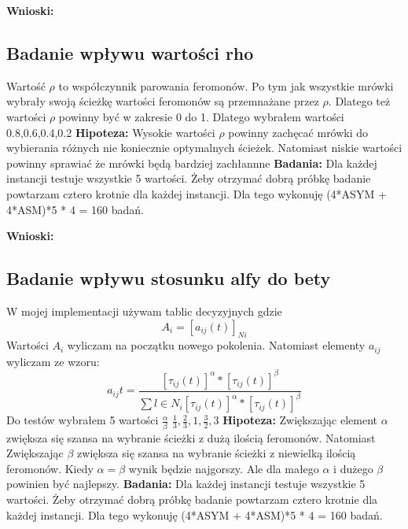 \documentclass{article}
\begin{document}
        \textbf{Wnioski: } 
      \subsection{Badanie wpływu wartości rho}
        Wartość $\rho$ to współczynnik parowania feromonów. Po tym jak wszystkie
        mrówki wybrały swoją ścieżkę wartości feromonów są przemnażane przez $\rho$.
        Dlatego też wartości $\rho$ powinny być w zakresie 0 do 1. Dlatego wybrałem
        wartości 0.8,0.6,0.4,0.2\linebreak
        \textbf{Hipoteza: } Wysokie wartości $\rho$ powinny zachęcać mrówki do wybierania
        różnych nie koniecznie optymalnych ścieżek. Natomiast niskie wartości powinny 
        sprawiać że mrówki będą bardziej zachłannne\linebreak
        \textbf{Badania: } Dla każdej instancji testuje wszystkie 5 wartości. 
        Żeby otrzymać dobrą próbkę badanie powtarzam cztero krotnie dla każdej 
        instancji. Dla tego wykonuję (4*ASYM + 4*ASM)*5 * 4 = 160 badań.\linebreak

        \textbf{Wnioski: } 
      \subsection{Badanie wpływu stosunku alfy do bety}
        W mojej implementacji używam tablic decyzyjnych gdzie \[ A_i = [a_{ij} (t)]_{Ni}\]
        Wartości $A_i$ wyliczam na początku nowego pokolenia. Natomiast elementy $a_{ij}$
        wyliczam ze wzoru:
        \[
            a_{ij}t = \frac{[\tau_{ij}(t)]^\alpha*[\tau_{ij}(t)]^\beta}{\sum{l\in N_i}[\tau_{ij}(t)]^\alpha*[\tau_{ij}(t)]^\beta}
        \]
        Do testów wybrałem 5 wartości $\frac{\alpha}{\beta}$ $\frac{1}{3},\frac{2}{3},1,\frac{3}{2},3$\linebreak
        \textbf{Hipoteza: } Zwiększając element $\alpha$ zwiększa się szansa na wybranie ścieżki z dużą 
        ilością feromonów. Natomiast Zwiększając $\beta$ zwiększa się szansa na wybranie ścieżki z niewielką
        ilością feromonów. Kiedy $\alpha = \beta$ wynik będzie najgorszy. Ale dla małego $\alpha$ i dużego
        $\beta$ powinien być najlepszy. \linebreak
        \textbf{Badania: } Dla każdej instancji testuje wszystkie 5 wartości. 
        Żeby otrzymać dobrą próbkę badanie powtarzam cztero krotnie dla każdej 
        instancji. Dla tego wykonuję (4*ASYM + 4*ASM)*5 * 4 = 160 badań.\linebreak
        
\end{document}
